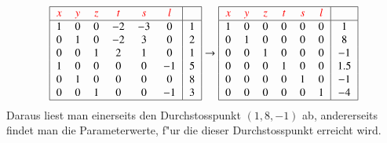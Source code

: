 \[
\begin{tabular}{|>{$}c<{$}>{$}c<{$}>{$}c<{$}>{$}c<{$}>{$}c<{$}>{$}c<{$}|>{$}c<{$}|}
\hline
{\color{red}x}&
{\color{red}y}&
{\color{red}z}&
{\color{red}t}&
{\color{red}s}&
{\color{red}l}&\\
\hline
1&0&0&-2&-3& 0&1\\
0&1&0&-2& 3& 0&2\\
0&0&1& 2& 1& 0&1\\
1&0&0& 0& 0&-1&5\\
0&1&0& 0& 0& 0&8\\
0&0&1& 0& 0&-1&3\\
\hline
\end{tabular}
\rightarrow
\begin{tabular}{|>{$}c<{$}>{$}c<{$}>{$}c<{$}>{$}c<{$}>{$}c<{$}>{$}c<{$}|>{$}c<{$}|}
\hline
{\color{red}x}&
{\color{red}y}&
{\color{red}z}&
{\color{red}t}&
{\color{red}s}&
{\color{red}l}&\\
\hline
1&0&0&0&0&0&1\\
0&1&0&0&0&0&8\\
0&0&1&0&0&0&-1\\
0&0&0&1&0&0&1.5\\
0&0&0&0&1&0&-1\\
0&0&0&0&0&1&-4\\
\hline
\end{tabular}
\]
Daraus liest man einerseits den Durchstosspunkt $(1,8,-1)$ ab, andererseits
findet man die Parameterwerte, f"ur die dieser Durchstosspunkt erreicht wird.

